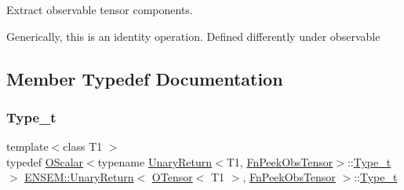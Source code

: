 Extract observable tensor components. 

Generically, this is an identity operation. Defined differently under observable 

\subsection{Member Typedef Documentation}
\mbox{\label{structENSEM_1_1UnaryReturn_3_01OTensor_3_01T1_01_4_00_01FnPeekObsTensor_01_4_abefeb4103abe844c4b6cbc2df22fd844}} 
\subsubsection{\texorpdfstring{Type\_t}{Type\_t}\hspace{0.1cm}{\footnotesize\ttfamily [1/2]}}
{\footnotesize\ttfamily template$<$class T1 $>$ \\
typedef \mbox{\hyperlink{classENSEM_1_1OScalar}{O\+Scalar}}$<$typename \mbox{\hyperlink{structENSEM_1_1UnaryReturn}{Unary\+Return}}$<$T1, \mbox{\hyperlink{structENSEM_1_1FnPeekObsTensor}{Fn\+Peek\+Obs\+Tensor}}$>$\+::\mbox{\hyperlink{structENSEM_1_1UnaryReturn_3_01OTensor_3_01T1_01_4_00_01FnPeekObsTensor_01_4_abefeb4103abe844c4b6cbc2df22fd844}{Type\+\_\+t}}$>$ \mbox{\hyperlink{structENSEM_1_1UnaryReturn}{E\+N\+S\+E\+M\+::\+Unary\+Return}}$<$ \mbox{\hyperlink{classENSEM_1_1OTensor}{O\+Tensor}}$<$ T1 $>$, \mbox{\hyperlink{structENSEM_1_1FnPeekObsTensor}{Fn\+Peek\+Obs\+Tensor}} $>$\+::\mbox{\hyperlink{structENSEM_1_1UnaryReturn_3_01OTensor_3_01T1_01_4_00_01FnPeekObsTensor_01_4_abefeb4103abe844c4b6cbc2df22fd844}{Type\+\_\+t}}}

\mbox{\label{structENSEM_1_1UnaryReturn_3_01OTensor_3_01T1_01_4_00_01FnPeekObsTensor_01_4_abefeb4103abe844c4b6cbc2df22fd844}} 
